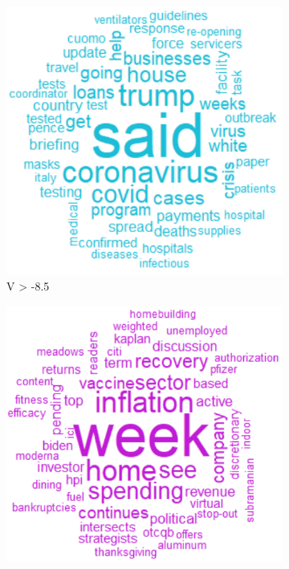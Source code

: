 \documentclass[a4paper, 12pt]{report}
\begin{document}
    \begin{figure}[H]
    \begin{subfigure}[t]{.32\textwidth}
        \centering
        \includegraphics[width=\textwidth]{graphs/Seeking_Alpha/var_wordclouds_a.png}
        \caption{V > -8.5}
        \label{Fig:var_wordclouds_a}
    \end{subfigure}
    \begin{subfigure}[t]{.32\textwidth}
        \centering
        \includegraphics[width=\textwidth]{graphs/Seeking_Alpha/var_wordclouds_b.png}

\end{subfigure}
\end{figure}
\end{document}
